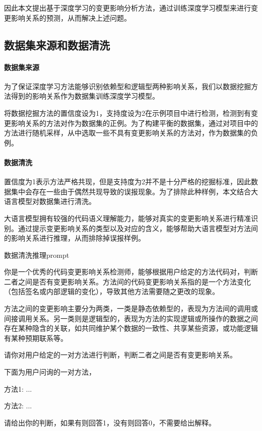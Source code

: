 因此本文提出基于深度学习的变更影响分析方法，通过训练深度学习模型来进行变更影响关系的预测，从而解决上述问题。

\subsection{数据集来源和数据清洗}

\paragraph{数据集来源}

为了保证深度学习方法能够识别依赖型和逻辑型两种影响关系，我们以数据挖掘方法得到的影响关系作为数据集训练深度学习模型。

将数据挖掘方法的置信度设为1，支持度设为2在示例项目中进行检测，检测到有变更影响关系的方法对作为数据集的正例。为了构建平衡的数据集，通过对项目中的方法进行随机采样，从中选取一些不具有变更影响关系的方法对，作为数据集的负例。

\paragraph{数据清洗}

置信度为1表示方法严格共现，但是支持度为2并不是十分严格的挖掘标准，因此数据集中会存在一些由于偶然共现导致的误报现象。为了排除此种样例，本文结合大语言模型对数据集进行清洗。

大语言模型拥有较强的代码语义理解能力，能够对真实的变更影响关系进行精准识别。通过提示变更影响关系的类型以及对应的含义，能够帮助大语言模型对方法间的影响关系进行推理，从而排除掉误报样例。


\begin{promptbox}{数据清洗推理prompt}

你是一个优秀的代码变更影响关系检测师，能够根据用户给定的方法代码对，判断二者之间是否有变更影响关系。方法间的代码变更影响关系指的是一个方法变化（包括签名或内部逻辑的变化），导致其他方法需要随之更改的现象。

方法之间的变更影响主要分为两类，一类是静态依赖型的，表现为方法间的调用或间接调用关系。另一类则是逻辑型的，表现为方法的实现逻辑或所操作的数据之间存在某种隐含的关联，如共同维护某个数据的一致性、共享某些资源，或功能逻辑有某种预期联系等。

请你对用户给定的一对方法进行判断，判断二者之间是否有变更影响关系。

下面为用户问询的一对方法，

方法1:
...

方法2:
...

请给出你的判断，如果有则回答1，没有则回答0，不需要给出解释。
  
\end{promptbox}



